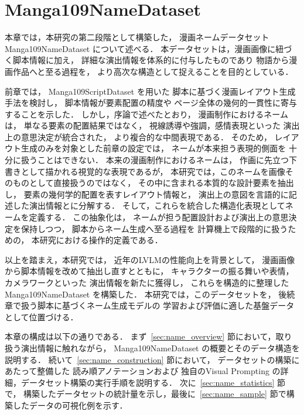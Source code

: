 \documentclass[a4j,12pt,dvipdfmx]{jsreport}
\begin{document}
\ifdefined\ismain\else
   \pagestyle{fancy}
   \lhead{\rightmark}
   \renewcommand{\chaptermark}[1]{\markboth{第\ \thechapter\ 章\ #1}{}}
   \setlength{\headheight}{16.5pt}
   \titleformat{\chapter}[hang]{\LARGE\bfseries}{\prechaptername\thechapter\postchaptername}{1em}{}
\fi

\chapter{Manga109NameDataset}\label{chap:manga109name}

本章では，本研究の第二段階として構築した，
漫画ネームデータセット Manga109NameDataset について述べる．
本データセットは，漫画画像に紐づく脚本情報に加え，
詳細な演出情報を体系的に付与したものであり
物語から漫画作品へと至る過程を，
より高次な構造として捉えることを目的としている．

前章では，
Manga109ScriptDataset を用いた
脚本に基づく漫画レイアウト生成手法を検討し，
脚本情報が要素配置の精度や
ページ全体の幾何的一貫性に寄与することを示した．
しかし，序論で述べたとおり，
漫画制作におけるネームは，
単なる要素の配置結果ではなく，
視線誘導や強調，感情表現といった
演出上の意思決定が統合された，
より複合的な中間表現である．
そのため，
レイアウト生成のみを対象とした前章の設定では，
ネームが本来担う表現的側面を
十分に扱うことはできない．
本来の漫画制作におけるネームは，
作画に先立つ下書きとして描かれる視覚的な表現であるが，
本研究では，このネームを画像そのものとして直接扱うのではなく，
その中に含まれる本質的な設計要素を抽出し，
要素の幾何学的配置を表すレイアウト情報と，
演出上の意図を言語的に記述した演出情報とに分解する．
そして，これらを統合した構造化表現としてネームを定義する．
この抽象化は，
ネームが担う配置設計および演出上の意思決定を保持しつつ，
脚本からネーム生成へ至る過程を
計算機上で段階的に扱うための，
本研究における操作的定義である．

以上を踏まえ，本研究では，
近年のLVLMの性能向上を背景として，
漫画画像から脚本情報を改めて抽出し直すとともに，
キャラクターの振る舞いや表情，カメラワークといった
演出情報を新たに獲得し，
これらを構造的に整理した
Manga109NameDataset を構築した．
本研究では，このデータセットを，
後続章で扱う脚本に基づくネーム生成モデルの
学習および評価に適した基盤データとして位置づける．

本章の構成は以下の通りである．
まず~\ref{sec:name_overview} 節において，取り扱う演出情報に触れながら，
Manga109NameDataset の概要とそのデータ構造を説明する．
続いて~\ref{sec:name_construction} 節において，
データセットの構築にあたって整備した
読み順アノテーションおよび
独自のVisual Prompting の詳細，データセット構築の実行手順を説明する．
次に~\ref{sec:name_statistics} 節で，
構築したデータセットの統計量を示し，最後に~\ref{sec:name_sample} 節で構築したデータの可視化例を示す．
\end{document}
